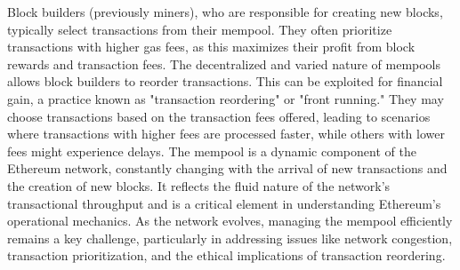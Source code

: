 Block builders (previously miners), who are responsible for creating new blocks, typically select transactions from their mempool. They often prioritize transactions with higher gas fees, as this maximizes their profit from block rewards and transaction fees. The decentralized and varied nature of mempools allows block builders to reorder transactions. This can be exploited for financial gain, a practice known as "transaction reordering" or "front running." They may choose transactions based on the transaction fees offered, leading to scenarios where transactions with higher fees are processed faster, while others with lower fees might experience delays.
The mempool is a dynamic component of the Ethereum network, constantly changing with the arrival of new transactions and the creation of new blocks. It reflects the fluid nature of the network’s transactional throughput and is a critical element in understanding Ethereum's operational mechanics. As the network evolves, managing the mempool efficiently remains a key challenge, particularly in addressing issues like network congestion, transaction prioritization, and the ethical implications of transaction reordering.